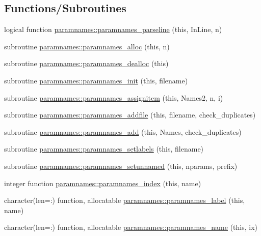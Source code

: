 \subsection*{Functions/\+Subroutines}
\begin{DoxyCompactItemize}
\item 
logical function \mbox{\hyperlink{namespaceparamnames_a6d210fed8da76c1fe28e96b8c0724666}{paramnames\+::paramnames\+\_\+parseline}} (this, In\+Line, n)
\item 
subroutine \mbox{\hyperlink{namespaceparamnames_a3e5401d3e44bed7bfdeed12938fa58fa}{paramnames\+::paramnames\+\_\+alloc}} (this, n)
\item 
subroutine \mbox{\hyperlink{namespaceparamnames_a0abbaf0b2bcd5b60c2d7c16746b07934}{paramnames\+::paramnames\+\_\+dealloc}} (this)
\item 
subroutine \mbox{\hyperlink{namespaceparamnames_a1e5be5e1dda784956ba3a9d7985e7f15}{paramnames\+::paramnames\+\_\+init}} (this, filename)
\item 
subroutine \mbox{\hyperlink{namespaceparamnames_a00d55ae57c0418d420115dfef427565f}{paramnames\+::paramnames\+\_\+assignitem}} (this, Names2, n, i)
\item 
subroutine \mbox{\hyperlink{namespaceparamnames_a962b36a1c8121b164c4206bdc3223ea7}{paramnames\+::paramnames\+\_\+addfile}} (this, filename, check\+\_\+duplicates)
\item 
subroutine \mbox{\hyperlink{namespaceparamnames_a6f6eda35d34074cc502b9beddae16e62}{paramnames\+::paramnames\+\_\+add}} (this, Names, check\+\_\+duplicates)
\item 
subroutine \mbox{\hyperlink{namespaceparamnames_a84f661e30d02319c827007cbbe6b587c}{paramnames\+::paramnames\+\_\+setlabels}} (this, filename)
\item 
subroutine \mbox{\hyperlink{namespaceparamnames_a14599044d57b0e3f49f29352409664d9}{paramnames\+::paramnames\+\_\+setunnamed}} (this, nparams, prefix)
\item 
integer function \mbox{\hyperlink{namespaceparamnames_a5c76e741768703cbbdcc06df7508eb55}{paramnames\+::paramnames\+\_\+index}} (this, name)
\item 
character(len=\+:) function, allocatable \mbox{\hyperlink{namespaceparamnames_a67f4dfa5bf287848c1f621644fd7d32b}{paramnames\+::paramnames\+\_\+label}} (this, name)
\item 
character(len=\+:) function, allocatable \mbox{\hyperlink{namespaceparamnames_a05a1562d6920ecef38e54e88dc6aa7a3}{paramnames\+::paramnames\+\_\+name}} (this, ix)

\end{DoxyCompactItemize}
